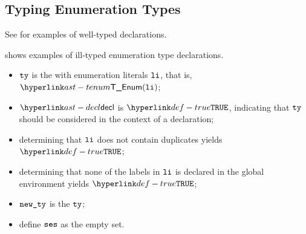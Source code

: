 \subsection{Typing Enumeration Types\label{sec:TypingEnumerationTypes}}
See  for examples of well-typed \enumerationtypesterm{}
declarations.

 shows examples of ill-typed enumeration type declarations.

\ProseParagraph
\AllApply
\begin{itemize}
  \item $\tty$ is the \enumerationtypeterm{} with enumeration literals
        $\vli$, that is, $\TEnum(\vli)$;
  \item $\decl$ is $\True$, indicating that $\tty$ should be considered in the context of a declaration;
  \item determining that $\vli$ does not contain duplicates yields $\True$\ProseOrTypeError;
  \item determining that none of the labels in $\vli$ is declared in the global environment
  yields $\True$\ProseOrTypeError;
  \item $\newty$ is the \enumerationtypeterm{} $\tty$;
  \item define $\vses$ as the empty set.
\end{itemize}

\FormallyParagraph
\begin{mathpar}
\end{mathpar}

